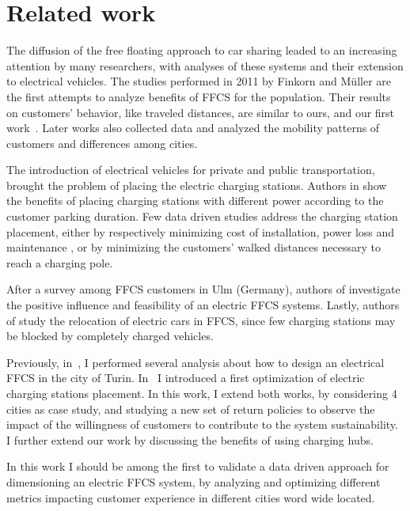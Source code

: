 \section{Related work}
\label{sec:related}

The diffusion of the free floating approach to car sharing leaded to an increasing attention by many researchers, with  analyses of
these systems and their extension to electrical vehicles. 
The studies performed  in 2011 by Finkorn and M\"{u}ller \cite{Firnkorn2011,FM12} are the first attempts to analyze benefits of FFCS for the population. Their results on customers' behavior, like traveled distances, are similar to ours, and our first work~\cite{ciociolaumap}.
Later works \cite{Car2GoGlobalAnalysis,CSandSocial,Schmoller2015} also collected data and analyzed the mobility patterns of customers and differences among cities.

The introduction of electrical vehicles for private and public transportation, brought the problem of placing the electric charging stations. Authors in \cite{ChargingStationForVehicularNetworks} show the benefits of placing charging stations with different power according to the customer parking duration. 
Few data driven studies address the charging station placement, either by respectively minimizing  cost of installation, power loss and maintenance  \cite{PlacementAndPowergrid,mipCSPpechino}, or by minimizing the customers' walked distances necessary to reach a charging pole\cite{placementAustin}. 

After a survey among FFCS customers in Ulm (Germany), authors of \cite{FM15}  investigate the positive influence and feasibility of an electric FFCS systems.
Lastly, authors of \cite{WB15} study the relocation of electric cars in FFCS, since few charging stations may be blocked by completely charged vehicles. 

Previously, in~\cite{taormina}, I performed several analysis about how to design an electrical FFCS in the city of Turin. In~\cite{maui} I introduced a first optimization of electric charging stations placement. In this work, I extend both works, by considering 4 cities as case study, and studying a new set of return policies to observe the impact of the willingness of customers to contribute to the system sustainability. I further extend our work by discussing the benefits of using charging hubs.

In this work I should be among the first to validate a data driven approach for dimensioning an electric FFCS system, by analyzing and optimizing different metrics impacting customer experience in different cities word wide located.

